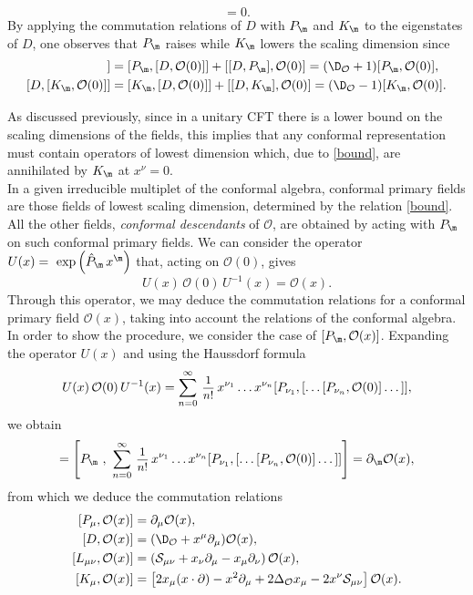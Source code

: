\documentclass[a4paper,11pt,openright,twoside]{book}
\let\n=\nu      \let\x=\xi     \let\p=\pi      \let\r=\rho
\newcommand{\sdfrac}[2]{\mbox{\small$\displaystyle\frac{#1}{#2}$}}
\numberwithin{equation}{section}
\begin{document}
\begin{equation}
	[K_\m,\mathcal{O}(0)]=0.\label{bound}
\end{equation}
By applying the commutation relations of $D$ with $P_\m$ and $K_\m$ to the eigenstates of $D$, one observes that $P_\m$ raises  while $K_\m$ lowers the scaling dimension  since
\begin{align}
	[D,[P_\m,\mathcal{O}(0)]]&=[P_\m,[D,\mathcal{O}(0)]]+[[D,P_\m],\mathcal{O}(0)]=(\D_\mathcal{O}+1)[P_\m,\mathcal{O}(0)],\\
	[D,[K_\m,\mathcal{O}(0)]]&=[K_\m,[D,\mathcal{O}(0)]]+[[D,K_\m],\mathcal{O}(0)]=(\D_\mathcal{O}-1)[K_\m,\mathcal{O}(0)].
\end{align}

As discussed previously, since in a unitary CFT there is a lower bound on the scaling dimensions of the fields, this implies that any conformal representation must contain operators of lowest dimension which, due to \eqref{bound}, are annihilated by $K_\m$ at $x^\n=0$. \\
In a given irreducible multiplet of the conformal algebra, conformal primary fields are those fields of lowest scaling dimension, determined by the relation \eqref{bound}. All the other fields, \emph{conformal descendants} of $\mathcal{O}$, are obtained by acting with $P_\m$ on such conformal primary fields. 
We can consider the operator $U(x)=~\exp\left(\hat P_\m\,x^\m\right)$ that, acting on $\mathcal{O}(0)$, gives
\begin{equation}
	U(x)\,\mathcal{O}(0)\,U^{-1}(x)=\mathcal{O}(x).
\end{equation}
Through this operator, we may deduce the commutation relations for a conformal primary field $\mathcal{O}(x)$, taking into account the relations of the conformal algebra. In order to show the procedure, we consider the case of $[P_\m,\mathcal{O}(x)]$. Expanding the operator $U(x)$ and using the Haussdorf formula
\begin{equation}
	U(x)\,\mathcal{O}(0)\,U^{-1}(x)=\sum_{n=0}^\infty\,\sdfrac{1}{n!}\,x^{\n_1}\dots x^{\n_n}[P_{\n_1},[\dots[P_{\n_n},\mathcal{O}(0)]\dots]],
\end{equation}
we obtain
\begin{align}
	[P_\m,U(x)\,\mathcal{O}(0)\,U^{-1}(x)]=\left[P_\m\ ,\ \sum_{n=0}^\infty\,\sdfrac{1}{n!}\,x^{\n_1}\dots x^{\n_n}[P_{\n_1},[\dots[P_{\n_n},\mathcal{O}(0)]\dots]]\right]=\partial_\m\mathcal{O}(x),
\end{align}
from which we deduce the commutation relations
\begin{equation}
	\begin{split}
		[P_\mu,\mathcal{O}(x)]&=\partial_\mu\mathcal{O}(x),\\
		[D,\mathcal{O}(x)]&=(\D_\mathcal{O}+x^\mu\partial_\mu)\mathcal{O}(x),\\
		[L_{\mu\nu},\mathcal{O}(x)]&=\left(\mathcal{S}_{\mu\nu}+x_\nu\partial_\mu-x_\mu\partial_\nu\right)\mathcal{O}(x),\\
		[K_\mu,\mathcal{O}(x)]&=\left[2x_\mu (x\cdot\partial)-x^2\partial_\mu+2\Delta_\mathcal{O} x_\mu-2x^\nu\mathcal{S}_{\mu\nu}\right]\mathcal{O}(x).
	\end{split}\label{transform}
\end{equation}
\end{document}
